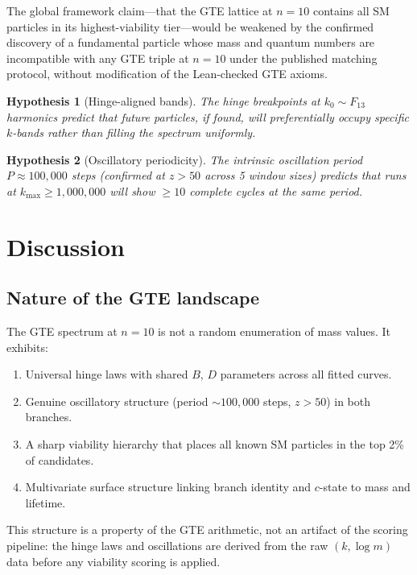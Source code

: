 \documentclass[12pt]{article}
\numberwithin{equation}{section}
\newtheorem{hypothesis}{Hypothesis}
\begin{document}
The global framework claim---that the GTE lattice at $n{=}10$ contains all SM particles in its highest-viability tier---would be weakened by the confirmed discovery of a fundamental particle whose mass and quantum numbers are incompatible with any GTE triple at $n{=}10$ under the published matching protocol, without modification of the Lean-checked GTE axioms.

\begin{hypothesis}[Hinge-aligned bands]
The hinge breakpoints at $k_0 \sim F_{13}$ harmonics predict that future particles, if found, will preferentially occupy specific $k$-bands rather than filling the spectrum uniformly.
\end{hypothesis}

\begin{hypothesis}[Oscillatory periodicity]
The intrinsic oscillation period $P \approx 100{,}000$ steps (confirmed at $z > 50$ across 5 window sizes) predicts that runs at $k_{\max} \geq 1{,}000{,}000$ will show ${\geq}10$ complete cycles at the same period.
\end{hypothesis}

\section{Discussion}
\label{sec:discussion}

\subsection{Nature of the GTE landscape}

The GTE spectrum at $n{=}10$ is not a random enumeration of mass values. It exhibits:
\begin{enumerate}[nosep]
\item Universal hinge laws with shared $B$, $D$ parameters across all fitted curves.
\item Genuine oscillatory structure (period ${\sim}100{,}000$ steps, $z > 50$) in both branches.
\item A sharp viability hierarchy that places all known SM particles in the top 2\% of candidates.
\item Multivariate surface structure linking branch identity and $c$-state to mass and lifetime.
\end{enumerate}

This structure is a property of the GTE arithmetic, not an artifact of the scoring pipeline: the hinge laws and oscillations are derived from the raw $(k, \log m)$ data before any viability scoring is applied.
\end{document}
